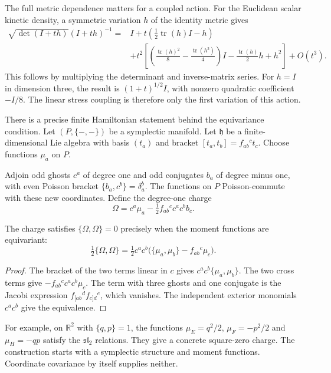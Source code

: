 The full metric dependence matters for a coupled action.
For the Euclidean scalar kinetic density, a symmetric variation $h$ of the
identity metric gives
\begin{equation}\label{mht:eq:gravity-quadratic-density}
 \begin{split}
 \sqrt{\det(I+th)}(I+th)^{-1}
 ={}&I+t\left(\tfrac12\operatorname{tr}(h)I-h\right)\\
 &+t^2\left[
 \left(\frac{\operatorname{tr}(h)^2}{8}
        -\frac{\operatorname{tr}(h^2)}4\right)I
 -\frac{\operatorname{tr}(h)}2h+h^2\right]+O(t^3).
 \end{split}
\end{equation}
This follows by multiplying the determinant and inverse-matrix
series. For $h=I$ in dimension three, the result is
$(1+t)^{1/2}I$, with nonzero quadratic coefficient $-I/8$.
The linear stress coupling is therefore only the first variation
of this action.

There is a precise finite Hamiltonian statement behind the
equivariance condition. Let $(P,\{-,-\})$ be a symplectic manifold.
Let $\mathfrak h$ be a finite-dimensional Lie algebra with basis
$(t_a)$ and bracket $[t_a,t_b]=f_{ab}{}^ct_c$.
Choose functions $\mu_a$ on $P$.

Adjoin odd ghosts $c^a$ of degree one and odd conjugates $b_a$
of degree minus one, with even Poisson bracket
$\{b_a,c^b\}=\delta_a^b$.
The functions on $P$ Poisson-commute with these new coordinates.
Define the degree-one charge
\[
 \Omega=c^a\mu_a-\tfrac12f_{ab}{}^c c^ac^bb_c.
\]

\begin{proposition}\label{mht:prop:gravity-hamiltonian-charge}
The charge satisfies $\{\Omega,\Omega\}=0$ precisely when the moment functions
are equivariant:
\[
 \tfrac12\{\Omega,\Omega\}
 =\tfrac12c^ac^b
       \bigl(\{\mu_a,\mu_b\}-f_{ab}{}^c\mu_c\bigr).
\]
\end{proposition}

\begin{proof}
The bracket of the two terms linear in $c$ gives
$c^ac^b\{\mu_a,\mu_b\}$.
The two cross terms give $-f_{ab}{}^c c^ac^b\mu_c$.
The term with three ghosts and one conjugate is the Jacobi
expression $f_{[ab}{}^d f_{c]d}{}^e$, which vanishes.
The independent exterior monomials $c^ac^b$ give the equivalence.
\end{proof}

For example, on $\mathbb R^2$ with $\{q,p\}=1$, the functions
$\mu_E=q^2/2$, $\mu_F=-p^2/2$ and $\mu_H=-qp$
satisfy the $\mathfrak{sl}_2$ relations.
They give a concrete square-zero charge.
The construction starts with a symplectic structure and moment
functions. Coordinate covariance by itself supplies neither.

